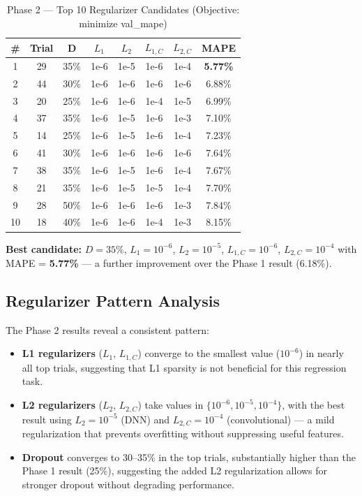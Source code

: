 \documentclass[11pt,a4paper]{article}
\begin{document}
\begin{table}[H]
\centering
\caption{Phase 2 — Top 10 Regularizer Candidates (Objective: minimize val\_mape)}
\begin{tabular}{cccccccc}
\toprule
\textbf{\#} & \textbf{Trial} & \textbf{D} & $L_1$ & $L_2$ & $L_{1,C}$ & $L_{2,C}$ & \textbf{MAPE} \\
\midrule
1 & 29 & 35\% & 1e-6 & 1e-5 & 1e-6 & 1e-4 & \textbf{5.77\%} \\
2 & 44 & 30\% & 1e-6 & 1e-6 & 1e-6 & 1e-6 & 6.88\% \\
3 & 20 & 25\% & 1e-6 & 1e-6 & 1e-4 & 1e-5 & 6.99\% \\
4 & 37 & 35\% & 1e-6 & 1e-5 & 1e-6 & 1e-3 & 7.10\% \\
5 & 14 & 25\% & 1e-6 & 1e-5 & 1e-6 & 1e-4 & 7.23\% \\
6 & 41 & 30\% & 1e-6 & 1e-6 & 1e-6 & 1e-6 & 7.64\% \\
7 & 38 & 35\% & 1e-6 & 1e-5 & 1e-6 & 1e-4 & 7.67\% \\
8 & 21 & 35\% & 1e-6 & 1e-5 & 1e-5 & 1e-4 & 7.70\% \\
9 & 28 & 50\% & 1e-6 & 1e-6 & 1e-6 & 1e-3 & 7.84\% \\
10 & 18 & 40\% & 1e-6 & 1e-6 & 1e-4 & 1e-3 & 8.15\% \\
\bottomrule
\end{tabular}
\end{table}

\textbf{Best candidate:} $D = 35\%$, $L_1 = 10^{-6}$, $L_2 = 10^{-5}$, $L_{1,C} = 10^{-6}$, $L_{2,C} = 10^{-4}$ with MAPE = \textbf{5.77\%} — a further improvement over the Phase 1 result (6.18\%).

\subsection{Regularizer Pattern Analysis}

The Phase 2 results reveal a consistent pattern:
\begin{itemize}
    \item \textbf{L1 regularizers} ($L_1$, $L_{1,C}$) converge to the smallest value ($10^{-6}$) in nearly all top trials, suggesting that L1 sparsity is not beneficial for this regression task.
    \item \textbf{L2 regularizers} ($L_2$, $L_{2,C}$) take values in $\{10^{-6}, 10^{-5}, 10^{-4}\}$, with the best result using $L_2 = 10^{-5}$ (DNN) and $L_{2,C} = 10^{-4}$ (convolutional) — a mild regularization that prevents overfitting without suppressing useful features.
    \item \textbf{Dropout} converges to 30--35\% in the top trials, substantially higher than the Phase 1 result (25\%), suggesting the added L2 regularization allows for stronger dropout without degrading performance.
\end{itemize}
\end{document}
